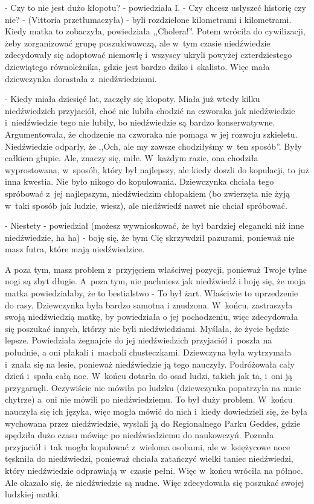 \documentclass[oneside,polish,12pt,sfheadings]{mwbk}
\begin{document}
- Czy to nie jest dużo kłopotu? - powiedziała I. - Czy chcesz usłyszeć
historię czy nie? - (Vittoria przetłumaczyła) - byli rozdzielone kilometrami
i kilometrami. Kiedy matka to zobaczyła, powiedziała ,,Cholera!''.
Potem wróciła do cywilizacji, żeby zorganizować grupę poszukiwawczą,
ale w~tym czasie niedźwiedzie zdecydowały się adoptować niemowlę i~wszyscy ukryli powyżej czterdziestego dziewiątego równoleżnika, gdzie
jest bardzo dziko i~skalisto. Więc mała dziewczynka dorastała z~niedźwiedziami.

- Kiedy miała dziesięć lat, zaczęły się kłopoty. Miała już wtedy kilku
niedźwiedzich przyjaciół, choć nie lubiła chodzić na czworaka jak
niedźwiedzie i~niedźwiedzie tego nie lubiły, bo niedźwiedzie są bardzo
konserwatywne. Argumentowała, że chodzenie na czworaka nie pomaga
w jej rozwoju szkieletu. Niedźwiedzie odparły, że ,,Och, ale my zawsze
chodziłyśmy w~ten sposób''. Były całkiem głupie. Ale, znaczy się,
miłe. W~każdym razie, ona chodziła wyprostowana, w~sposób, który był
najlepszy, ale kiedy doszli do kopulacji, to już inna kwestia. Nie
było nikogo do kopulowania. Dziewczynka chciała tego spróbować z~jej
najlepszym, niedźwiedzim chłopakiem (bo zwierzęta nie żyją w~taki
sposób jak ludzie, wiesz), ale niedźwiedź nawet nie chciał spróbować.

- Niestety - powiedział (możesz wywnioskować, że był bardziej elegancki
niż inne niedźwiedzie, ha ha) - boję się, że bym Cię skrzywdził pazurami,
ponieważ nie masz futra, które mają niedźwiedzice.

A poza tym, masz problem z~przyjęciem właściwej pozycji, ponieważ
Twoje tylne nogi są zbyt długie. A~poza tym, nie pachniesz jak niedźwiedź
i boję się, że moja matka powiedziałaby, że to bestialstwo - To był
żart. Właściwie to uprzedzenie do rasy. Dziewczynka była bardzo samotna
i znudzona. W~końcu, zastraszyła swoją niedźwiedzią matkę, by powiedziała
o jej pochodzeniu, więc zdecydowała się poszukać innych, którzy nie
byli niedźwiedziami. Myślała, że życie będzie lepsze. Powiedziała
żegnajcie do jej niedźwiedzich przyjaciół i~poszła na południe, a
oni płakali i~machali chusteczkami. Dziewczyna była wytrzymała i~znała
się na lesie, ponieważ niedźwiedzie ją tego nauczyły. Podróżowała
cały dzień i~spała całą noc. W~końcu dotarła do osad ludzi, takich
jak ta, i~oni ją przygarnęli. Oczywiście nie mówiła po ludzku (dziewczynka
popatrzyła na mnie chytrze) a~oni nie mówili po niedźwiedziemu. To
był duży problem. W~końcu nauczyła się ich języka, więc mogła mówić
do nich i~kiedy dowiedzieli się, że była wychowana przez niedźwiedzie,
wysłali ją do Regionalnego Parku Geddes, gdzie spędziła dużo czasu
mówiąc po niedźwiedziemu do naukowczyń. Poznała przyjaciół i~tak mogła
kopulować z~wieloma osobami, ale w~księżycowe noce tęskniła do niedźwiedzi,
ponieważ chciała zatańczyć wielki taniec niedźwiedzi, który niedźwiedzie
odprawiają w~czasie pełni. Więc w~końcu wróciła na północ. Ale okazało
się, że niedźwiedzie są nudne. Więc zdecydowała się poszukać swojej
ludzkiej matki.
\end{document}
